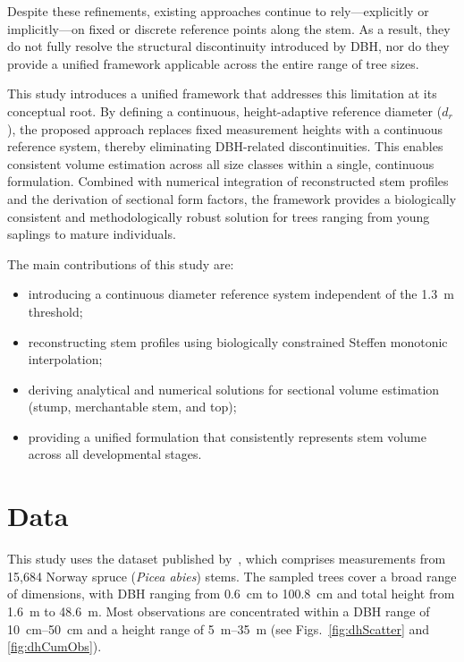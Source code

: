 \documentclass[twocolumn, bibliography=totoc]{scrartcl}
\begin{document}
Despite these refinements, existing approaches continue to rely—explicitly or implicitly—on fixed or discrete reference points along the stem. As a result, they do not fully resolve the structural discontinuity introduced by DBH, nor do they provide a unified framework applicable across the entire range of tree sizes.

This study introduces a unified framework that addresses this limitation at its conceptual root. By defining a continuous, height-adaptive reference diameter ($d_r$), the proposed approach replaces fixed measurement heights with a continuous reference system, thereby eliminating DBH-related discontinuities. This enables consistent volume estimation across all size classes within a single, continuous formulation. Combined with numerical integration of reconstructed stem profiles and the derivation of sectional form factors, the framework provides a biologically consistent and methodologically robust solution for trees ranging from young saplings to mature individuals.

The main contributions of this study are:
\begin{itemize}
\item introducing a continuous diameter reference system independent of the \qty{1.3}{m} threshold;
\item reconstructing stem profiles using biologically constrained Steffen monotonic interpolation;
\item deriving analytical and numerical solutions for sectional volume estimation (stump, merchantable stem, and top);
\item providing a unified formulation that consistently represents stem volume across all developmental stages.
\end{itemize}


\section{Data}

This study uses the dataset published by~\cite{Didion2024sectionWiseStemDiametersText,Didion2024sectionWiseStemDiametersData}, which comprises measurements from 15,684 Norway spruce (\textit{Picea abies}) stems. The sampled trees cover a broad range of dimensions, with DBH ranging from \qty{0.6}{cm} to \qty{100.8}{cm} and total height from \qty{1.6}{m} to \qty{48.6}{m}. Most observations are concentrated within a DBH range of \qtyrange{10}{50}{cm} and a height range of \qtyrange{5}{35}{m} (see Figs.~\ref{fig:dhScatter} and \ref{fig:dhCumObs}).
\end{document}
